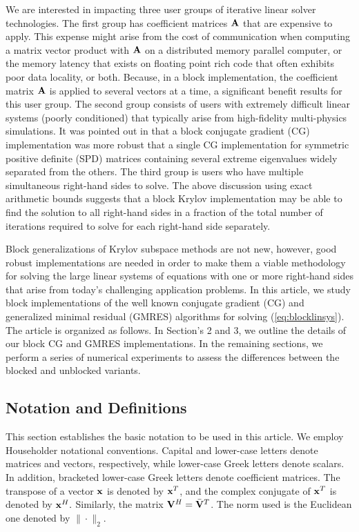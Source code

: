 \documentclass[twoside]{siamltex}
\newcommand{\bA}{{\bf A}}
\newcommand{\bV}{{\bf V}}
\begin{document}
We are interested in impacting three user groups of iterative
linear solver technologies. The first group has coefficient
matrices $\bA$ that are expensive to apply. This expense might
arise from the cost of communication when computing a matrix
vector product with $\bA$ on a distributed memory parallel
computer, or the memory latency that exists on floating point rich
code that often exhibits poor data locality, or both. Because, in
a block implementation, the coefficient matrix $\bA$ is applied to
several vectors at a time, a significant benefit results for this
user group. The second group consists of users with extremely
difficult linear systems (poorly conditioned) that typically arise
from high-fidelity multi-physics simulations. It was pointed out
in \cite{olea:80} that a block conjugate gradient (CG)
implementation was more robust that a single CG implementation for
symmetric positive definite (SPD) matrices containing several
extreme eigenvalues widely separated from the others. The third
group is users who have multiple simultaneous right-hand sides to
solve. The above discussion using exact arithmetic bounds suggests
that a block Krylov implementation may be able to find the
solution to all right-hand sides in a fraction of the total number
of iterations required to solve for each right-hand side
separately.

Block generalizations of Krylov subspace methods are not new,
however, good robust implementations are needed in order to make
them a viable methodology for solving the large linear systems of
equations with one or more right-hand sides that arise from
today's challenging application problems. In this article, we
study block implementations of the well known conjugate gradient
(CG) \cite{HS52} and generalized minimal residual
(GMRES)\cite{SS86} algorithms for solving (\ref{eq:blocklinsys}).
The article is organized as follows.  In Section's 2 and 3, we
outline the details of our block CG and GMRES implementations. In
the remaining sections, we perform a series of numerical
experiments to assess the differences between the blocked and
unblocked variants.

\subsection{Notation and Definitions}
\label{notation_and_terminology}

This section establishes the basic notation to be used in this
article. We employ Householder notational conventions. Capital and
lower-case letters denote matrices and vectors, respectively,
while lower-case Greek letters denote scalars. In addition,
bracketed lower-case Greek letters denote coefficient matrices.
The transpose of a vector ${\bf x}$ is denoted by ${\bf x}^T$, and
the complex conjugate of ${\bf x}^T$ is denoted by ${\bf x}^H.$
Similarly, the matrix $\bV^H = {\bar \bV}^T$. The norm used is the
Euclidean one denoted by $\| \cdot \|_2.$
\end{document}
